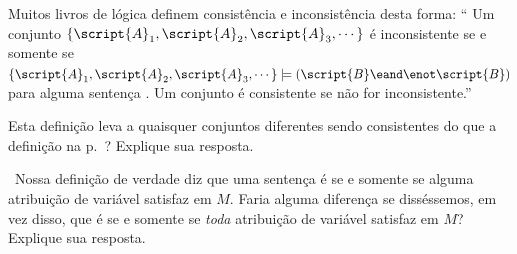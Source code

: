 \problempart
\label{pr.SemanticsEssay}
\begin{earg}
\item Muitos livros de lógica definem consistência e inconsistência desta forma:
`` Um conjunto $\{\script{A}_1,\script{A}_2,\script{A}_3,\cdots\}$ é inconsistente se e somente se $\{\script{A}_1,\script{A}_2,\script{A}_3,\cdots\}\models(\script{B}\eand\enot\script{B})$ para alguma sentença . Um conjunto é consistente se não for inconsistente.''

Esta definição leva a quaisquer conjuntos diferentes sendo consistentes do que a definição na p.~\pageref{def.consistencySL}? Explique sua resposta.

\item\leftsolutions\ Nossa definição de verdade diz que uma sentença  é   se e somente se alguma atribuição de variável satisfaz  em $M$. Faria alguma diferença se disséssemos, em vez disso, que  é   se e somente se \emph{toda} atribuição de variável satisfaz  em $M$? Explique sua resposta.
\end{earg}
